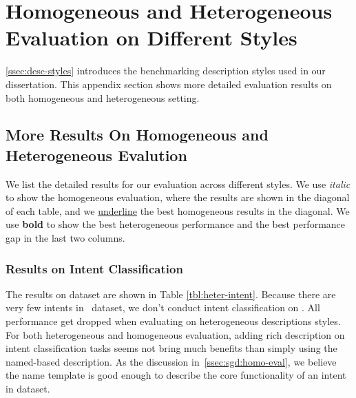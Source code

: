 \section[Homogeneous and Heterogeneous Evaluation on Different Styles]{Homogeneous and Heterogeneous \\Evaluation on Different Styles}
\label{sec:sgd:more-desc-results}
\autoref{ssec:desc-styles} introduces the benchmarking description
styles used in our dissertation. This appendix section shows more
detailed evaluation results on both homogeneous and heterogeneous
setting.


\subsection[More Results On Homogeneous and Heterogeneous Evalution]{More Results On Homogeneous and \\Heterogeneous Evalution}
\label{ssec:sgd:more-hete-results}
We list the detailed results for our evaluation across different
styles. We use {\it italic} to show the homogeneous evaluation, where
the results are shown in the diagonal of each table, and we
\underline{underline} the best homogeneous results in the diagonal. We
use {\bf bold} to show the best heterogeneous performance and the best
performance gap in the last two columns.

\subsubsection{Results on Intent Classification}
\label{ssec:sgd:results-ic}
The results on \sgdst dataset are shown in Table
\ref{tbl:heter-intent}. Because there are very few intents in
\multiwoz~dataset, we don't conduct intent classification on
\multiwoz. All performance get dropped when evaluating on
heterogeneous descriptions styles. For both heterogeneous and
homogeneous evaluation, adding rich description on intent
classification tasks seems not bring much benefits than simply using
the named-based description. As the discussion
in~\autoref{ssec:sgd:homo-eval}, we believe the name template is good
enough to describe the core functionality of an intent in \sgdst
dataset.


